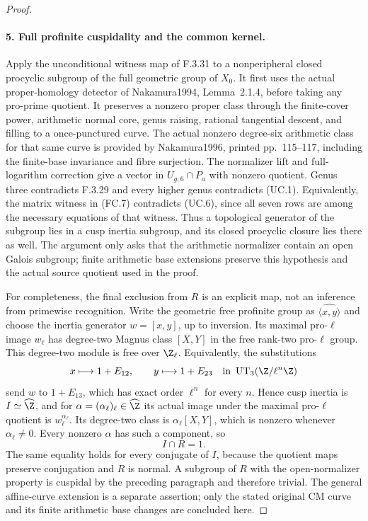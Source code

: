 \begin{proof}
\paragraph{5. Full profinite cuspidality and the common kernel.}
Apply the unconditional witness map of F.3.31 to a
nonperipheral closed procyclic subgroup of the full
geometric group of $X_0$. It first uses the actual
proper-homology detector of Nakamura1994, Lemma~2.1.4,
before taking any pro-prime quotient\cite[pp.~96--97]{AuditNakamura1994}.
It preserves a nonzero proper class through the
finite-cover power, arithmetic normal core, genus
raising, rational tangential descent, and filling
to a once-punctured curve. The actual nonzero
degree-six arithmetic class for that same curve is
provided by Nakamura1996, printed pp.~115--117,
including the finite-base invariance and fibre
surjection\cite{AuditNakamura1996}. The normalizer
lift and full-logarithm correction give a vector
in $U_{g,6}\cap P_a$ with nonzero quotient. Genus
three contradicts F.3.29 and every higher genus
contradicts (UC.1). Equivalently, the matrix witness
in (FC.7) contradicts (UC.6), since all seven rows
are among the necessary equations of that witness.
Thus a topological generator of the subgroup lies
in a cusp inertia subgroup, and its closed procyclic
closure lies there as well. The argument only asks
that the arithmetic normalizer contain an open
Galois subgroup; finite arithmetic base extensions
preserve this hypothesis and the actual source
quotient used in the proof.

For completeness, the final exclusion from $R$ is
an explicit map, not an inference from primewise
recognition. Write the geometric free profinite
group as $\widehat{\langle x,y\rangle}$ and choose
the inertia generator $w=[x,y]$, up to inversion.
Its maximal pro-$\ell$ image $w_\ell$ has degree-two
Magnus class $[X,Y]$ in the free rank-two pro-$\ell$
group. This degree-two module is free over $\Z_\ell$.
Equivalently, the substitutions
\[
 x\longmapsto 1+E_{12},\qquad
 y\longmapsto 1+E_{23}
       \quad\text{in }\operatorname{UT}_3(\Z/\ell^n\Z)
\]
send $w$ to $1+E_{13}$, which has exact order
$\ell^n$ for every $n$. Hence cusp inertia is
$I\simeq\widehat\Z$, and for
$\alpha=(\alpha_\ell)_\ell\in\widehat\Z$ its actual
image under the maximal pro-$\ell$ quotient is
$w_\ell^{\alpha_\ell}$. Its degree-two class is
$\alpha_\ell[X,Y]$, which is nonzero whenever
$\alpha_\ell\ne0$. Every nonzero $\alpha$ has such
a component, so
\[
                             I\cap R=1.
\]
The same equality holds for every conjugate of $I$,
because the quotient maps preserve conjugation
and $R$ is normal. A subgroup of $R$ with the
open-normalizer property is cuspidal by the
preceding paragraph and therefore trivial.
The general affine-curve extension is a separate
assertion; only the stated original CM curve and
its finite arithmetic base changes are concluded here.
\end{proof}

